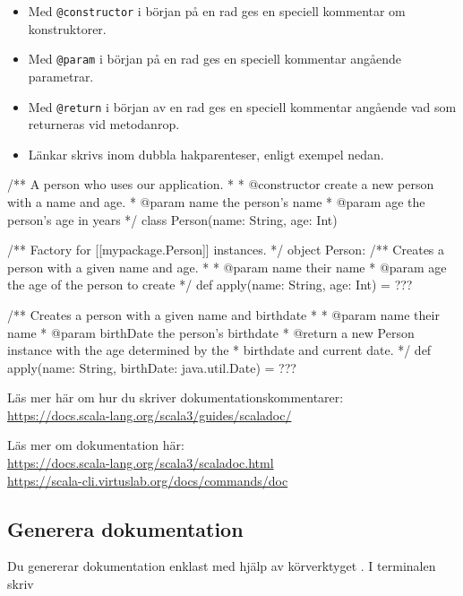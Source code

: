 \begin{itemize}
\item Med \verb|@constructor| i början på en rad ges en speciell kommentar om konstruktorer. 
\item Med \verb|@param| i början på en rad ges en speciell kommentar angående parametrar. 
\item Med \verb|@return| i början av en rad ges en speciell kommentar angående vad som returneras vid metodanrop.
\item Länkar skrivs inom dubbla hakparenteser, enligt exempel nedan.
\end{itemize}

\begin{Code}
/** A person who uses our application.
 *
 *  @constructor create a new person with a name and age.
 *  @param name the person's name
 *  @param age the person's age in years
 */
class Person(name: String, age: Int)  

/** Factory for [[mypackage.Person]] instances. */
object Person:
  /** Creates a person with a given name and age.
   *
   *  @param name their name
   *  @param age the age of the person to create
   */
  def apply(name: String, age: Int) = ???

  /** Creates a person with a given name and birthdate
   *
   *  @param name their name
   *  @param birthDate the person's birthdate
   *  @return a new Person instance with the age determined by the
   *          birthdate and current date.
   */
  def apply(name: String, birthDate: java.util.Date) = ???

\end{Code}


Läs mer här om hur du skriver dokumentationskommentarer: \\
\url{https://docs.scala-lang.org/scala3/guides/scaladoc/}

Läs mer om dokumentation här:\\
\url{https://docs.scala-lang.org/scala3/scaladoc.html}\\
\url{https://scala-cli.virtuslab.org/docs/commands/doc}



\subsection{Generera dokumentation}


Du genererar dokumentation enklast med hjälp av körverktyget . 
I terminalen skriv \\ 

